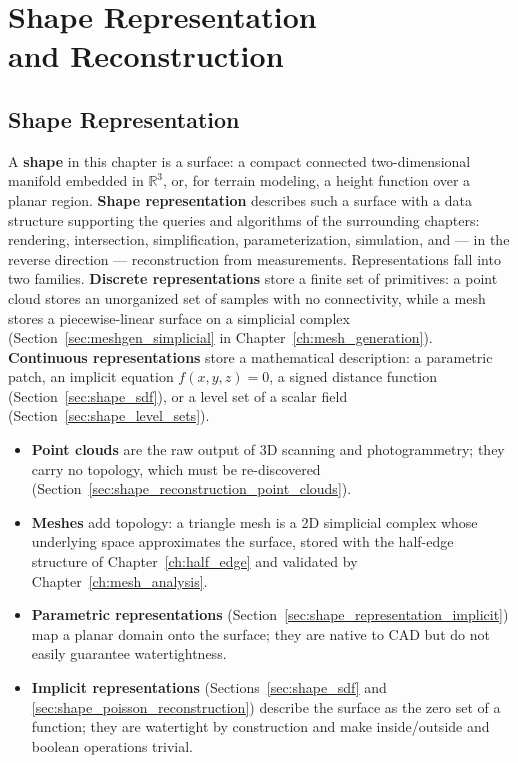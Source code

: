 \chapter[Shape Representation and Reconstruction]{Shape Representation\\ and Reconstruction}
\label{ch:shape_reconstruction}

\section{Shape Representation}
\label{sec:shape_representation}

A \textbf{shape} in this chapter is a surface: a compact
connected two-dimensional manifold embedded in $\mathbb{R}^3$, or, for terrain
modeling, a height function over a planar region. \textbf{Shape
representation} describes such a surface with a
data structure supporting the queries and algorithms of the surrounding
chapters: rendering, intersection, simplification, parameterization,
simulation, and --- in the reverse direction --- reconstruction from
measurements. Representations fall into two families. \textbf{Discrete
representations} store a finite set of primitives: a point cloud stores an
unorganized set of samples with no connectivity, while a mesh stores a
piecewise-linear surface on a simplicial complex
(Section~\ref{sec:meshgen_simplicial} in Chapter~\ref{ch:mesh_generation}).
\textbf{Continuous representations} store a mathematical description: a
parametric patch, an implicit equation $f(x, y, z) = 0$, a signed distance
function (Section~\ref{sec:shape_sdf}), or a level set of a scalar field
(Section~\ref{sec:shape_level_sets}).

\begin{itemize}
  \item \textbf{Point clouds} are the raw output of 3D
    scanning and photogrammetry; they carry no topology, which must be
    re-discovered (Section~\ref{sec:shape_reconstruction_point_clouds}).
  \item \textbf{Meshes} add topology: a triangle mesh is a 2D simplicial
    complex whose underlying space approximates the surface, stored with the
    half-edge structure of Chapter~\ref{ch:half_edge} and validated by
    Chapter~\ref{ch:mesh_analysis}.
  \item \textbf{Parametric representations}
    (Section~\ref{sec:shape_representation_implicit}) map a planar domain onto
    the surface; they are native to CAD but do not easily guarantee
    watertightness.
  \item \textbf{Implicit representations} (Sections~\ref{sec:shape_sdf} and
    \ref{sec:shape_poisson_reconstruction}) describe the surface as the zero
    set of a function; they are watertight by construction and make
    inside/outside and boolean operations trivial.
\end{itemize}

